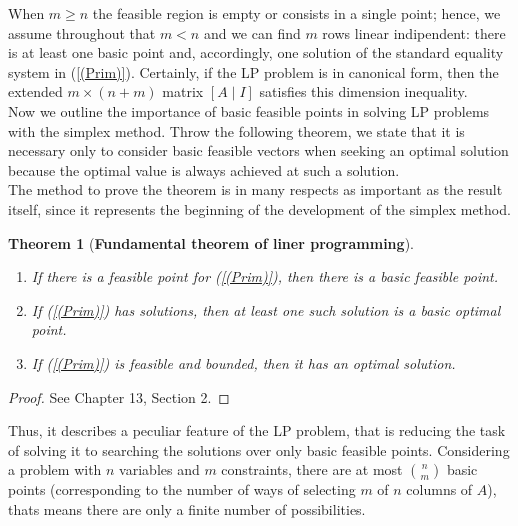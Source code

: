 \documentclass[a4paper,10 pt,titlepage,twoside]{report}
\theoremstyle{plain}
\newtheorem{thm}{Theorem}[chapter]
\theoremstyle{definition}
\theoremstyle{remark}
\begin{document}
When $m \geq n$ the feasible region is empty or consists in a single point; hence, we assume throughout that $m < n$ and we can find $m$ rows linear indipendent: there is at least one basic point and, accordingly, one solution of the standard equality system in (\ref{(Prim)}). Certainly, if the LP problem is in canonical form, then the extended $m \times (n+m)$ matrix $[A\;|\;I]$ 
satisfies this dimension inequality. \\
Now we outline the importance of basic feasible points in solving LP problems with the simplex method.
Throw the following theorem, we state that it is necessary only to consider basic feasible
vectors when seeking an optimal solution because the optimal
value is always achieved at such a solution.\\ The method to prove the theorem is in many respects as important as the result itself, since it represents the beginning of the development of the simplex
method.
\begin{thm}[\textbf{Fundamental theorem of liner programming}]\label{Fund}
\begin{enumerate}
	\
\item If there is a feasible point for (\ref{(Prim)}), then there is a basic feasible point.
\item If (\ref{(Prim)}) has solutions, then at least one such solution is a basic optimal point.
\item If (\ref{(Prim)}) is feasible and bounded, then it has an optimal solution.
\end{enumerate}
\end{thm}
\begin{proof}
	See \cite{W} Chapter 13, Section 2.
\end{proof}
Thus, it describes a peculiar feature of the LP problem, that is reducing the task of solving it to searching the solutions over only basic feasible points. Considering a problem with $n$ variables and $m$ constraints, there are at most ${n}\choose{m}$ basic points (corresponding to the number of ways of selecting $m$ of $n$ columns of $A$), thats means there are only a finite number of possibilities.\\[0.5cm] 
\end{document}
